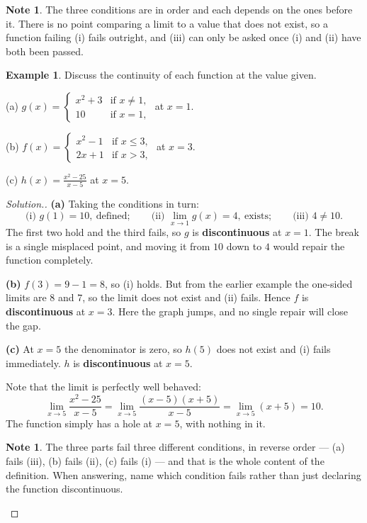 \documentclass[11pt,a4paper]{article}
\theoremstyle{definition}
\newtheorem{example}[thm]{Example}
\newtheorem{note}[thm]{Note}
\newenvironment{solution}
  {\renewcommand{\qedsymbol}{}\begin{proof}[\textit{Solution}.]}
  {\end{proof}}
\begin{document}
\begin{note}
The three conditions are in order and each depends on the ones before it. There is no
point comparing a limit to a value that does not exist, so a function failing (i) fails
outright, and (iii) can only be asked once (i) and (ii) have both been passed.
\end{note}

\begin{example}
Discuss the continuity of each function at the value given.

(a) $g(x)=\begin{cases} x^2+3 & \text{if } x\neq 1,\\ 10 & \text{if } x=1,\end{cases}$
\quad at $x=1$.

(b) $f(x)=\begin{cases} x^2-1 & \text{if } x\leq 3,\\ 2x+1 & \text{if } x>3,\end{cases}$
\quad at $x=3$.

(c) $h(x)=\frac{x^2-25}{x-5}$ \quad at $x=5$.
\end{example}

\begin{solution}
\textbf{(a)} Taking the conditions in turn:
$$\text{(i) } g(1)=10,\ \text{defined};\qquad
\text{(ii) } \lim_{x\to 1}g(x)=4,\ \text{exists};\qquad
\text{(iii) } 4\neq 10.$$
The first two hold and the third fails, so $g$ is \textbf{discontinuous} at $x=1$. The
break is a single misplaced point, and moving it from $10$ down to $4$ would repair the
function completely.

\textbf{(b)} $f(3)=9-1=8$, so (i) holds. But from the earlier example the one-sided
limits are $8$ and $7$, so the limit does not exist and (ii) fails. Hence $f$ is
\textbf{discontinuous} at $x=3$. Here the graph jumps, and no single repair will close
the gap.

\textbf{(c)} At $x=5$ the denominator is zero, so $h(5)$ does not exist and (i) fails
immediately. $h$ is \textbf{discontinuous} at $x=5$.

Note that the limit is perfectly well behaved:
$$\lim_{x\to 5}\frac{x^2-25}{x-5}=\lim_{x\to 5}\frac{(x-5)(x+5)}{x-5}
=\lim_{x\to 5}(x+5)=10.$$
The function simply has a hole at $x=5$, with nothing in it.

\begin{note}
The three parts fail three different conditions, in reverse order --- (a) fails (iii),
(b) fails (ii), (c) fails (i) --- and that is the whole content of the definition. When
answering, name which condition fails rather than just declaring the function
discontinuous.
\end{note}
\end{solution}
\end{document}
